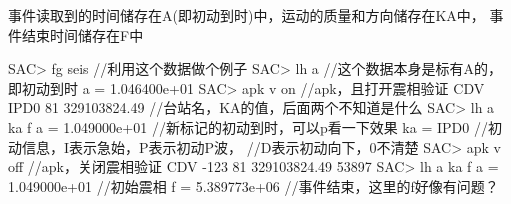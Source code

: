 事件读取到的时间储存在A(即初动到时)中，运动的质量和方向储存在KA中，
事件结束时间储存在F中

\begin{SACCode}
SAC> fg seis                //利用这个数据做个例子
SAC> lh a                   //这个数据本身是标有A的，即初动到时
     a = 1.046400e+01
SAC> apk v on               //apk，且打开震相验证
 CDV IPD0 81 329103824.49   //台站名，KA的值，后面两个不知道是什么
SAC> lh a ka f
      a = 1.049000e+01      //新标记的初动到时，可以p看一下效果
     ka = IPD0              //初动信息，I表示急始，P表示初动P波，
                            //D表示初动向下，0不清楚
SAC> apk v off              //apk，关闭震相验证
 CDV -123 81 329103824.49   53897
SAC> lh a ka f
     a = 1.049000e+01       //初始震相
     f = 5.389773e+06       //事件结束，这里的f好像有问题？
\end{SACCode}
